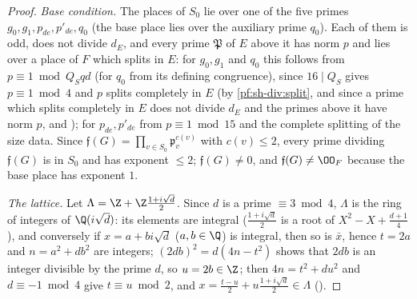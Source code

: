 \begin{proof}
\emph{Base condition.} The places of $S_0$ lie over one of the five primes $g_0,g_1,p_{de},p'_{de},q_0$ (the base place lies over
the auxiliary prime $q_0$). Each of them is odd, does not divide $d_E$, and every prime $\mathfrak P$ of $E$ above it has norm $p$ and
lies over a place of $F$ which splits in $E$: for $g_0,g_1$ and $q_0$ this follows from $p\equiv1\bmod Q_Sqd$ (for $q_0$ from its
defining congruence), since $16\mid Q_S$ gives $p\equiv1\bmod4$ and $p$ splits completely in $E$
(by \cref{pf:sh-div:split}, and since a prime which splits completely in $E$ does not divide $d_E$ and the primes above it have norm $p$,  and ); for $p_{de},p'_{de}$ from
$p\equiv1\bmod15$ and the complete splitting of the size data. Since $\mathfrak f(G)=\prod_{v\in S_0}\mathfrak p_v^{c(v)}$ with
$c(v)\le2$, every prime dividing $\mathfrak f(G)$ is in $S_0$ and has exponent $\le2$; $\mathfrak f(G)\ne0$, and $\mathfrak f(G)\ne\OO_F$
because the base place has exponent $1$.

\emph{The lattice.} Let $\Lambda=\Z+\Z\frac{1+i\sqrt d}2$. Since $d$ is a prime $\equiv3\bmod4$, $\Lambda$ is the ring of integers of
$\Q(i\sqrt d)$: its elements are integral ($\frac{1+i\sqrt d}2$ is a root of $X^2-X+\frac{d+1}4$), and conversely if $x=a+bi\sqrt d$
($a,b\in\Q$) is integral, then so is $\bar x$, hence $t=2a$ and $n=a^2+db^2$ are integers; $(2db)^2=d(4n-t^2)$ shows that $2db$ is an integer divisible by the prime $d$, so $u=2b\in\Z$;
then $4n=t^2+du^2$ and $d\equiv-1\bmod4$ give $t\equiv u\bmod2$, and $x=\frac{t-u}2+u\frac{1+i\sqrt d}2\in\Lambda$
().
\end{proof}

